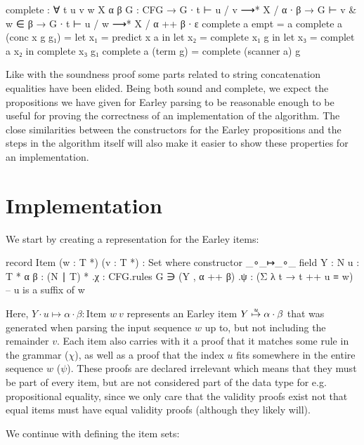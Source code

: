 		\begin{code}
			complete : ∀ {t u v w X α β} {G : CFG} →
			  G ∙ t ⊢ u / v ⟶* X / α ∙ β →
			  G ⊢ v & w ∈ β →
			    G ∙ t ⊢ u / w ⟶* X / α ++ β ∙ ε
			complete a empt = a
			complete a (conc x g g₁) =
			  let x₁ = predict x a in
			  let x₂ = complete x₁ g in
			  let x₃ = complet a x₂ in
			  complete x₃ g₁
			complete a (term g) = complete (scanner a) g
		\end{code}

		Like with the soundness proof some parts related to string
		concatenation equalities have been elided. Being both sound and
		complete, we expect the propositions we have given for Earley parsing
		to be reasonable enough to be useful for proving the correctness of an
		implementation of the algorithm. The close similarities between the
		constructors for the Earley propositions and the steps in the algorithm
		itself will also make it easier to show these properties for an
		implementation.

	\section{Implementation}

		We start by creating a representation for the Earley items:

		\begin{code}
			record Item (w : T *) (v : T *) : Set where
			  constructor _∘_↦_∘_
			  field
			    Y : N
			    u : T *
			    α β : (N ∣ T) *
			    .{χ} : CFG.rules G ∋ (Y , α ++ β)
			    .{ψ} : (Σ λ t → t ++ u ≡ w)        -- u is a suffix of w
		\end{code}

		Here, $Y \cdot u \mapsto \alpha \cdot \beta : \textrm{Item } w\ v$
		represents an Earley item $Y\overset{u}{\mapsto}\alpha\cdot\beta$ that was
		generated when parsing the input sequence $w$ up to, but not including
		the remainder $v$. Each item also carries with it a proof that it
		matches some rule in the grammar ($\chi$), as well as a proof that the
		index $u$ fits somewhere in the entire sequence $w$ ($\psi$). These
		proofs are declared irrelevant which means that they must be part of
		every item, but are not considered part of the data type for e.g.
		propositional equality, since we only care that the validity proofs
		exist not that equal items must have equal validity proofs (although
		they likely will).

		We continue with defining the item sets:

